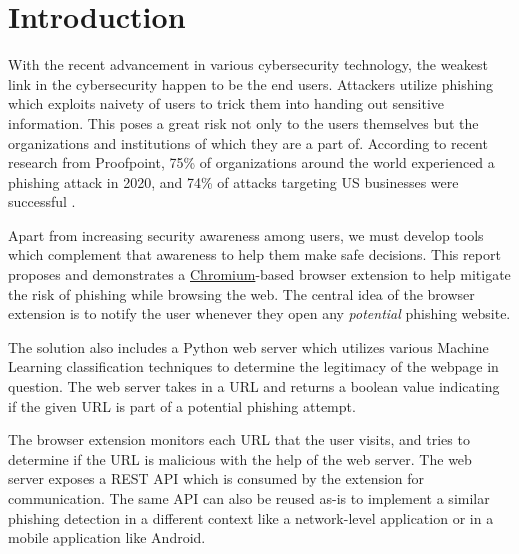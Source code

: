 \documentclass[conference]{IEEEtran}
\begin{document}
\section{Introduction}

With the recent advancement in various cybersecurity technology, the weakest link in the cybersecurity happen to be the end users.
Attackers utilize phishing which exploits naivety of users to trick them into handing out sensitive information.
This poses a great risk not only to the users themselves but the organizations and institutions of which they are a part of.
According to recent research from Proofpoint, 75\% of organizations around the world experienced a phishing attack in 2020, and 74\% of attacks targeting US businesses were successful \cite{stateofphishing}.

\par Apart from increasing security awareness among users, we must develop tools which complement that awareness to help them make safe decisions.
This report proposes and demonstrates a \href{https://www.chromium.org/Home}{Chromium}-based browser extension to help mitigate the risk of phishing while browsing the web.
The central idea of the browser extension is to notify the user whenever they open any \emph{potential} phishing website.

\par The solution also includes a Python web server which utilizes various Machine Learning classification techniques to determine the legitimacy of the webpage in question.
The web server takes in a URL and returns a boolean value indicating if the given URL is part of a potential phishing attempt.

\par The browser extension monitors each URL that the user visits, and tries to determine if the URL is malicious with the help of the web server.
The web server exposes a REST API which is consumed by the extension for communication.
The same API can also be reused as-is to implement a similar phishing detection in a different context like a network-level application or in a mobile application like Android.
\end{document}
